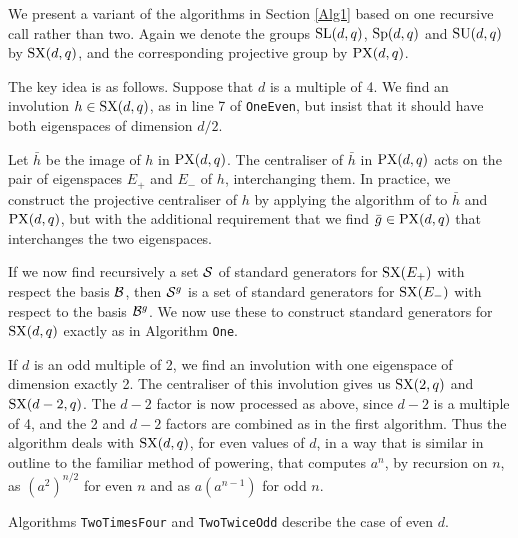 \documentclass[12pt]{article}
\def\SL{{\rm SL}}
\def\Sp{{\rm Sp}}
\def\SU{{\rm SU}}
\def\SX{{\rm SX}}
\def\PX{{\rm PX}}
\begin{document}
We present a variant of the algorithms in Section \ref{Alg1} based on  
one recursive call rather than two. Again we denote 
the groups $\SL(d,q)$, $\Sp(d,q)$
and $\SU(d,q)$ by $\SX(d,q)$, and the corresponding projective group
by $\PX(d,q)$.

The key idea is as follows. Suppose that $d$ is a multiple of 4.  
We find an involution $h \in \SX (d, q)$, as in line 7 of {\tt OneEven},
but insist that it should have both eigenspaces of dimension $d/2$. 

Let $\bar{h}$ be the image of $h$ in $\PX(d,q)$.
The centraliser of $\bar{h}$ in $\PX(d,q)$
acts on the pair of eigenspaces $E_+$ and $E_-$ of $h$, 
interchanging them. In practice, we construct the
projective centraliser of $h$ by applying the algorithm 
of \cite{Bray} to $\bar{h}$ and $\PX(d, q)$, but with the
additional requirement that we find $\bar{g} \in \PX(d, q)$ 
that interchanges the two eigenspaces. 

If we now find recursively a set $\cal S$ of
standard generators for $\SX(E_+)$ with respect the basis $\cal B$,
then ${\cal S}^g$ is a set of standard generators for $\SX(E_-)$ with
respect to the basis ${\cal B}^g$. We now use these 
to construct standard generators for 
$\SX(d,q)$ exactly as in Algorithm {\tt One}.

If $d$ is an odd multiple of 2, we find an involution with one
eigenspace of dimension exactly 2. The centraliser of this
involution gives us $\SX(2,q)$ and $\SX(d-2,q)$. The $d-2$
factor is now processed as above, since $d-2$ is a multiple of 4, and
the 2 and $d-2$ factors are combined as in the first algorithm. Thus
the algorithm deals with $\SX(d,q)$, for even  values of $d$, in a way
that  is similar in outline to the familiar method of powering, that
computes $a^n$, by recursion on $n$, as $(a^2)^{n/2}$ for even $n$ and
as $a(a^{n-1})$ for odd $n$.

Algorithms {\tt TwoTimesFour} and {\tt TwoTwiceOdd} 
describe the case of even $d$. 
\end{document}
